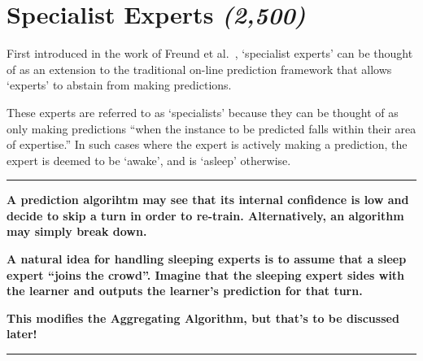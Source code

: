 \section{Specialist Experts \textit{(2,500)}}\label{section:Specialist_Experts}
First introduced in the work of Freund et al.\ \cite{freund:1997}, `specialist experts' can be thought of as an extension to the traditional on-line prediction framework that allows `experts' to abstain from making predictions. 

These experts are referred to as `specialists' because they can be thought of as only making predictions ``when the instance to be predicted falls within their area of expertise.'' In such cases where the expert is actively making a prediction, the expert is deemed to be `awake', and is `asleep' otherwise.
\newline
\rule{\textwidth}{0.1pt}
\textbf{A prediction algorihtm may see that its internal confidence is low and decide to skip a turn in order to re-train. Alternatively, an algorithm may simply break down.}

\textbf{A natural idea for handling sleeping experts is to assume that a sleep expert ``joins the crowd''. Imagine that the sleeping expert sides with the learner and outputs the learner's prediction for that turn.}

\textbf{This modifies the Aggregating Algorithm, but that's to be discussed later!}
\newline
\rule{\textwidth}{0.1pt}

